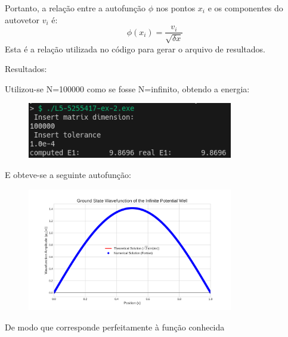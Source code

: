 \documentclass[12pt, a4paper]{article} %
\begin{document}
                Portanto, a relação entre a autofunção $\phi$ nos pontos $x_i$ e os componentes do autovetor $v_i$ é:
                \begin{equation}
                    \phi(x_i) = \frac{v_i}{\sqrt{\delta x}}
                \end{equation}
                Esta é a relação utilizada no código para gerar o arquivo de resultados.

        Resultados:

        Utilizou-se N=100000 como se fosse N=infinito, obtendo a energia:
        \begin{figure}[H]
            \centering
            \includegraphics[width=0.8\textwidth]{../images/ex2.png}
        \end{figure}
        E obteve-se a seguinte autofun\c{c}\~ao:
        \begin{figure}[H]
            \centering
            \includegraphics[width=0.8\textwidth]{../images/wavefunction_plot.png}
        \end{figure}

    De modo que corresponde perfeitamente à fun\c{c}\~ao conhecida

        
\end{document}
